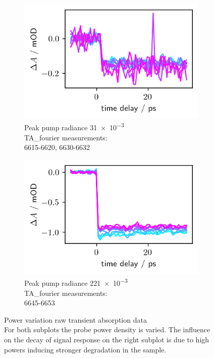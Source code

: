 \documentclass[twoside,openright]{scrreprt}
\begin{document}
\begin{figure}[hbtp]
\centering
\begin{subfigure}[t]{0.45\textwidth}
\centering
\includegraphics[scale=1]{images/PowerVarLowPumpVarProbe.png} 
\caption{Peak pump radiance \SI{31e-3}{\radExp}\\TA\_fourier measurements:\\ 6615-6620, 6630-6632\label{fig:PowerVarL}}
\end{subfigure}
\hfill
\begin{subfigure}[t]{0.45\textwidth}
\centering
\includegraphics[scale=1]{images/PowerVarHighPumpVariedProbe.png} 
\caption{Peak pump radiance \SI{221e-3}{\radExp}\\TA\_fourier measurements:\\ 6645-6653\label{fig:PowerVarR}}
\end{subfigure}
\caption{Power variation raw transient absorption data\\
For both subplots the probe power density is varied. The influence on the decay of signal response on the right subplot is due to high powers inducing stronger degradation in the sample.}
\end{figure}
\end{document}
